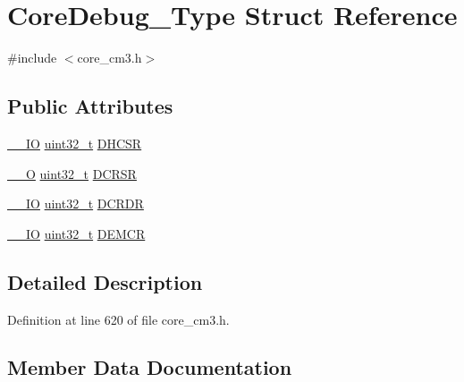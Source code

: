 \hypertarget{struct_core_debug___type}{}\section{Core\+Debug\+\_\+\+Type Struct Reference}
\label{struct_core_debug___type}


{\ttfamily \#include $<$core\+\_\+cm3.\+h$>$}

\subsection*{Public Attributes}
\begin{DoxyCompactItemize}
\item 
\hyperlink{group___c_m_s_i_s___c_m3__core__definitions_gaec43007d9998a0a0e01faede4133d6be}{\+\_\+\+\_\+\+IO} \hyperlink{_p_e___types_8h_a33594304e786b158f3fb30289278f5af}{uint32\+\_\+t} \hyperlink{struct_core_debug___type_a25c14c022c73a725a1736e903431095d}{D\+H\+C\+SR}
\item 
\hyperlink{group___c_m_s_i_s___c_m3__core__definitions_ga7e25d9380f9ef903923964322e71f2f6}{\+\_\+\+\_\+O} \hyperlink{_p_e___types_8h_a33594304e786b158f3fb30289278f5af}{uint32\+\_\+t} \hyperlink{struct_core_debug___type_afefa84bce7497652353a1b76d405d983}{D\+C\+R\+SR}
\item 
\hyperlink{group___c_m_s_i_s___c_m3__core__definitions_gaec43007d9998a0a0e01faede4133d6be}{\+\_\+\+\_\+\+IO} \hyperlink{_p_e___types_8h_a33594304e786b158f3fb30289278f5af}{uint32\+\_\+t} \hyperlink{struct_core_debug___type_ab8f4bb076402b61f7be6308075a789c9}{D\+C\+R\+DR}
\item 
\hyperlink{group___c_m_s_i_s___c_m3__core__definitions_gaec43007d9998a0a0e01faede4133d6be}{\+\_\+\+\_\+\+IO} \hyperlink{_p_e___types_8h_a33594304e786b158f3fb30289278f5af}{uint32\+\_\+t} \hyperlink{struct_core_debug___type_a5cdd51dbe3ebb7041880714430edd52d}{D\+E\+M\+CR}
\end{DoxyCompactItemize}


\subsection{Detailed Description}


Definition at line 620 of file core\+\_\+cm3.\+h.



\subsection{Member Data Documentation}
